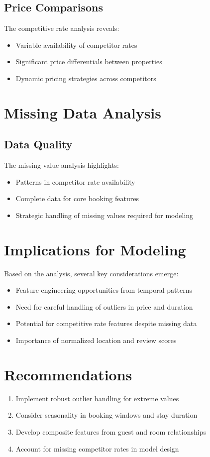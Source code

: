 \documentclass{article}
\begin{document}
\subsection{Price Comparisons}
The competitive rate analysis reveals:
\begin{itemize}
    \item Variable availability of competitor rates
    \item Significant price differentials between properties
    \item Dynamic pricing strategies across competitors
\end{itemize}

\section{Missing Data Analysis}
\subsection{Data Quality}


The missing value analysis highlights:
\begin{itemize}
    \item Patterns in competitor rate availability
    \item Complete data for core booking features
    \item Strategic handling of missing values required for modeling
\end{itemize}

\section{Implications for Modeling}
Based on the analysis, several key considerations emerge:
\begin{itemize}
    \item Feature engineering opportunities from temporal patterns
    \item Need for careful handling of outliers in price and duration
    \item Potential for competitive rate features despite missing data
    \item Importance of normalized location and review scores
\end{itemize}

\section{Recommendations}
\begin{enumerate}
    \item Implement robust outlier handling for extreme values
    \item Consider seasonality in booking windows and stay duration
    \item Develop composite features from guest and room relationships
    \item Account for missing competitor rates in model design
\end{enumerate}
\end{document}
